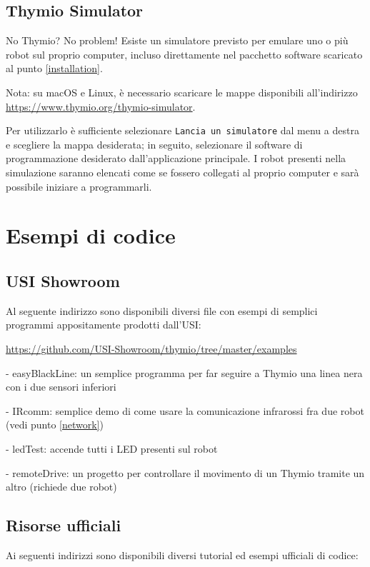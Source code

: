 \documentclass[12pt]{article}
\begin{document}
	\subsection{Thymio Simulator}
	
		No Thymio? No problem! Esiste un simulatore previsto per emulare uno o più robot sul proprio computer, incluso direttamente nel pacchetto software scaricato al punto \ref{installation}.
		
		Nota: su macOS e Linux, è necessario scaricare le mappe disponibili all'indirizzo \url{https://www.thymio.org/thymio-simulator}.
		
		Per utilizzarlo è sufficiente selezionare \texttt{Lancia un simulatore} dal menu a destra e scegliere la mappa desiderata; in seguito, selezionare il software di programmazione desiderato dall'applicazione principale.
		I robot presenti nella simulazione saranno elencati come se fossero collegati al proprio computer e sarà possibile iniziare a programmarli.
		
		
\section{Esempi di codice}

	\subsection{USI Showroom}\label{usiRepo}
		
		Al seguente indirizzo sono disponibili diversi file con esempi di semplici programmi appositamente prodotti dall'USI:
		
		\url{https://github.com/USI-Showroom/thymio/tree/master/examples}
		
		
		- easyBlackLine: un semplice programma per far seguire a Thymio una linea nera con i due sensori inferiori
		
		- IRcomm: semplice demo di come usare la comunicazione infrarossi fra due robot (vedi punto \ref{network})
		
		- ledTest: accende tutti i LED presenti sul robot
		
		- remoteDrive: un progetto per controllare il movimento di un Thymio tramite un altro (richiede due robot)
		
	
	\subsection{Risorse ufficiali}
	
		Ai seguenti indirizzi sono disponibili diversi tutorial ed esempi ufficiali di codice:
	
\end{document}
